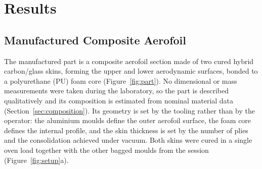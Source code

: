 \documentclass[11pt,a4paper]{article}
\newenvironment{addedblock}{\color{addgreen}}{}
\newenvironment{addedblock}{}{}
\begin{document}
\setcounter{section}{3}\label{sec:procedure}
\setcounter{section}{5}\label{sec:quality}
\setcounter{figure}{1}\label{fig:bagging}
\setcounter{section}{4}\setcounter{subsection}{0}
\setcounter{figure}{2}\setcounter{table}{2}\setcounter{equation}{0}

\section{Results}

\begin{addedblock}
\subsection{Manufactured Composite Aerofoil}

The manufactured part is a composite aerofoil section made of two
cured hybrid carbon/glass skins, forming the upper and lower
aerodynamic surfaces, bonded to a polyurethane (PU) foam core
(Figure~\ref{fig:part}). No dimensional or mass measurements were
taken during the laboratory, so the part is described qualitatively
and its composition is estimated from nominal material data
(Section~\ref{sec:composition}). Its geometry is set by the tooling
rather than by the operator: the aluminium moulds define the outer
aerofoil surface, the foam core defines the internal profile, and the
skin thickness is set by the number of plies and the consolidation
achieved under vacuum. Both skins were cured in a single oven load
together with the other bagged moulds from the session
(Figure~\ref{fig:setup}a).
\end{addedblock}
\end{document}
